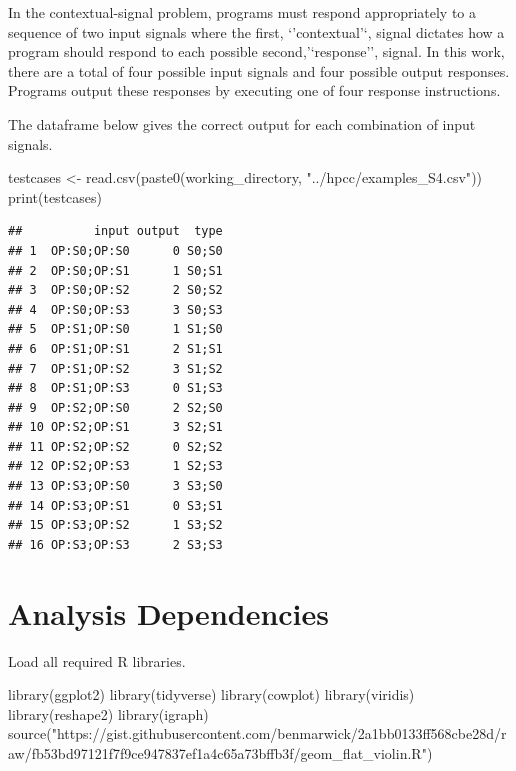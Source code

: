 \documentclass[
]{book}
\newenvironment{Shaded}{\begin{snugshade}}{\end{snugshade}}
\newcommand{\FunctionTok}[1]{\textcolor[rgb]{0.00,0.00,0.00}{#1}}
\newcommand{\NormalTok}[1]{#1}
\newcommand{\OtherTok}[1]{\textcolor[rgb]{0.56,0.35,0.01}{#1}}
\newcommand{\StringTok}[1]{\textcolor[rgb]{0.31,0.60,0.02}{#1}}
\begin{document}
In the contextual-signal problem, programs must respond appropriately to a sequence of two input signals where the first, `'contextual'`, signal dictates how a program should respond to each possible second,'`response'', signal.
In this work, there are a total of four possible input signals and four possible output responses.
Programs output these responses by executing one of four response instructions.

The dataframe below gives the correct output for each combination of input signals.

\begin{Shaded}
\begin{Highlighting}[]
\NormalTok{testcases }\OtherTok{\textless{}{-}} \FunctionTok{read.csv}\NormalTok{(}\FunctionTok{paste0}\NormalTok{(working\_directory, }\StringTok{"../hpcc/examples\_S4.csv"}\NormalTok{))}
\FunctionTok{print}\NormalTok{(testcases)}
\end{Highlighting}
\end{Shaded}

\begin{verbatim}
##          input output  type
## 1  OP:S0;OP:S0      0 S0;S0
## 2  OP:S0;OP:S1      1 S0;S1
## 3  OP:S0;OP:S2      2 S0;S2
## 4  OP:S0;OP:S3      3 S0;S3
## 5  OP:S1;OP:S0      1 S1;S0
## 6  OP:S1;OP:S1      2 S1;S1
## 7  OP:S1;OP:S2      3 S1;S2
## 8  OP:S1;OP:S3      0 S1;S3
## 9  OP:S2;OP:S0      2 S2;S0
## 10 OP:S2;OP:S1      3 S2;S1
## 11 OP:S2;OP:S2      0 S2;S2
## 12 OP:S2;OP:S3      1 S2;S3
## 13 OP:S3;OP:S0      3 S3;S0
## 14 OP:S3;OP:S1      0 S3;S1
## 15 OP:S3;OP:S2      1 S3;S2
## 16 OP:S3;OP:S3      2 S3;S3
\end{verbatim}

\hypertarget{analysis-dependencies-2}{%
\section{Analysis Dependencies}\label{analysis-dependencies-2}}

Load all required R libraries.

\begin{Shaded}
\begin{Highlighting}[]
\FunctionTok{library}\NormalTok{(ggplot2)}
\FunctionTok{library}\NormalTok{(tidyverse)}
\FunctionTok{library}\NormalTok{(cowplot)}
\FunctionTok{library}\NormalTok{(viridis)}
\FunctionTok{library}\NormalTok{(reshape2)}
\FunctionTok{library}\NormalTok{(igraph)}
\FunctionTok{source}\NormalTok{(}\StringTok{"https://gist.githubusercontent.com/benmarwick/2a1bb0133ff568cbe28d/raw/fb53bd97121f7f9ce947837ef1a4c65a73bffb3f/geom\_flat\_violin.R"}\NormalTok{)}
\end{Highlighting}
\end{Shaded}
\end{document}

